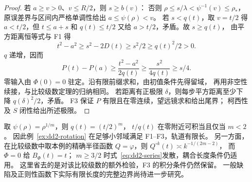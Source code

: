 \begin{proof}
若 $a\ge v>0$、$v\le R/2$，则 $s\ge b(v)$：
否则 $\rho\le s/\lambda<\psi^{-1}(v)\le\rho_*$，
原误差界与区间内严格单调性给出 $a\le\psi(\rho)<v$。
若 $s<q(t)$，取 $v=t/2$ 得 $a<t/2$，但
$t\le a+s$ 和 $q(t)\le t/2$ 又给 $a>t/2$，矛盾。故 $s\ge q(t)$，
由平方距离恒等式与 F1 得
\[
 t^2-a^2\ge s^2-2D(t)\ge s^2/2\ge q(t)^2/2>0.
\]
$q$ 递增，因而
\[
 P(t)-P(a)\ge\frac{t^2-a^2}{2q(t)}
 \ge\frac{s^2}{4q(t)}\ge s/4.
\]
零输入由 $\Phi(0)=0$ 驻定。沿有限前缀求和，由初值条件先得留域，
再用非空性续接，与比较级数定理的归纳相同。
若距离有正极限 $\delta$，则每步平方距离至少下降 $q(\delta)^2/2$，矛盾。
F3 保证 $P$ 有限且在零连续，望远镜求和给出尾界；
柯西性及 $S$ 闭性给出所述极限。
\end{proof}

取 $\psi(\rho)=\rho^{1/m}$，则 $q(t)=(t/2)^m$，
$t/q(t)$ 在零附近可积当且仅当 $m<2$。
因此例~\ref{ex:dd2-rotation} 在足够小邻域满足 F1--F3，轨道有限长。
另一方面，在比较级数中取本例的精确半径函数 $Q=\varphi$，则
$Q^{\circ k}(t)\asymp k^{-1/(2m-2)}$，
而 $\Phi=0$ 给 $B_\Phi(t)=t$；
$m\ge3/2$ 时式~\eqref{eq:dd2-series}发散，耦合长度条件仍适用。
这里省去的是对该比较级数的额外检验，F3 的积分条件仍然保留。
一般缺陷及正则性函数下实际有限长度的完整边界尚待进一步研究。
